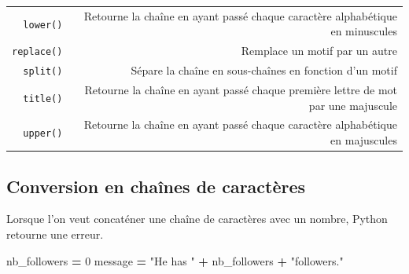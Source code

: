 \documentclass[12pt,]{book}
\newenvironment{Shaded}{\begin{snugshade}}{\end{snugshade}}
\newcommand{\DecValTok}[1]{\textcolor[rgb]{0.00,0.00,0.81}{#1}}
\newcommand{\StringTok}[1]{\textcolor[rgb]{0.31,0.60,0.02}{#1}}
\newcommand{\OperatorTok}[1]{\textcolor[rgb]{0.81,0.36,0.00}{\textbf{#1}}}
\newcommand{\NormalTok}[1]{#1}
\numberwithin{equation}{section}
\numberwithin{countremarque}{section}
\begin{document}
\begin{longtable}[]{@{}rr@{}}
\begin{minipage}[t]{0.15\columnwidth}
\texttt{lower()}\strut
\end{minipage} & \begin{minipage}[t]{0.79\columnwidth}\raggedleft\strut
Retourne la chaîne en ayant passé chaque caractère alphabétique en
minuscules\strut
\end{minipage}\tabularnewline
\begin{minipage}[t]{0.15\columnwidth}\raggedleft\strut
\texttt{replace()}\strut
\end{minipage} & \begin{minipage}[t]{0.79\columnwidth}\raggedleft\strut
Remplace un motif par un autre\strut
\end{minipage}\tabularnewline
\begin{minipage}[t]{0.15\columnwidth}\raggedleft\strut
\texttt{split()}\strut
\end{minipage} & \begin{minipage}[t]{0.79\columnwidth}\raggedleft\strut
Sépare la chaîne en sous-chaînes en fonction d'un motif\strut
\end{minipage}\tabularnewline
\begin{minipage}[t]{0.15\columnwidth}\raggedleft\strut
\texttt{title()}\strut
\end{minipage} & \begin{minipage}[t]{0.79\columnwidth}\raggedleft\strut
Retourne la chaîne en ayant passé chaque première lettre de mot par une
majuscule\strut
\end{minipage}\tabularnewline
\begin{minipage}[t]{0.15\columnwidth}\raggedleft\strut
\texttt{upper()}\strut
\end{minipage} & \begin{minipage}[t]{0.79\columnwidth}\raggedleft\strut
Retourne la chaîne en ayant passé chaque caractère alphabétique en
majuscules\strut
\end{minipage}\tabularnewline
\bottomrule
\end{longtable}

\subsection{Conversion en chaînes de
caractères}\label{conversion-chaines-caracteres}

Lorsque l'on veut concaténer une chaîne de caractères avec un nombre,
Python retourne une erreur.

\begin{Shaded}
\begin{Highlighting}[]
\NormalTok{nb_followers }\OperatorTok{=} \DecValTok{0}
\NormalTok{message }\OperatorTok{=} \StringTok{"He has "} \OperatorTok{+}\NormalTok{ nb_followers }\OperatorTok{+} \StringTok{"followers."}
\end{Highlighting}
\end{Shaded}
\end{document}
